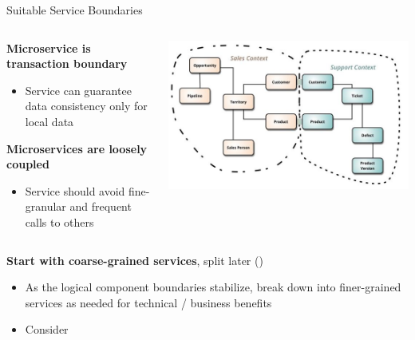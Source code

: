 \begin{frame}{Suitable Service Boundaries}
\begin{columns}[T] 
\begin{column}{.60\textwidth}
\textbf{Microservice is transaction boundary} 
    \begin{itemize}
    \item Service can guarantee data consistency only for local data
    \end{itemize}
\vfill
\textbf{Microservices are loosely coupled} 
    \begin{itemize}
    \item Service should avoid fine-granular and frequent calls to others
    \end{itemize}
\end{column}
\hfill
\begin{column}{.36\textwidth}
\centerline{\includegraphics[height=0.42\textheight]{../MicroServiceDesign/images/MicroServiceDesign}}
\end{column}
\end{columns}
\textbf{Start with coarse-grained services}, split later ()
    \begin{itemize}
    \item As the logical component boundaries stabilize, break down into finer-grained services as needed for technical / business benefits
    \item Consider 
    \end{itemize}
\end{frame}    


